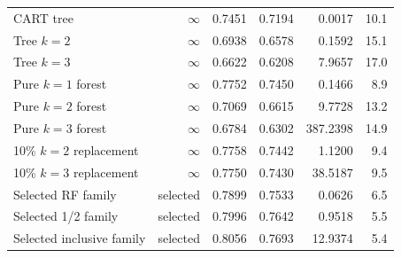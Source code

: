 \documentclass[final,5p,times]{elsarticle}
\begin{document}
\begin{table}[t]
\begin{tabular}{@{}lrrrrr@{}}
\addlinespace
CART tree & $\infty$ & 0.7451 & 0.7194 & 0.0017 & 10.1 \\
Tree $k=2$ & $\infty$ & 0.6938 & 0.6578 & 0.1592 & 15.1 \\
Tree $k=3$ & $\infty$ & 0.6622 & 0.6208 & 7.9657 & 17.0 \\
Pure $k=1$ forest & $\infty$ & 0.7752 & 0.7450 & 0.1466 & 8.9 \\
Pure $k=2$ forest & $\infty$ & 0.7069 & 0.6615 & 9.7728 & 13.2 \\
Pure $k=3$ forest & $\infty$ & 0.6784 & 0.6302 & 387.2398 & 14.9 \\
10\% $k=2$ replacement & $\infty$ & 0.7758 & 0.7442 & 1.1200 & 9.4 \\
10\% $k=3$ replacement & $\infty$ & 0.7750 & 0.7430 & 38.5187 & 9.5 \\
\midrule
Selected RF family & selected & 0.7899 & 0.7533 & 0.0626 & 6.5 \\
Selected 1/2 family & selected & 0.7996 & 0.7642 & 0.9518 & 5.5 \\
Selected inclusive family & selected & 0.8056 & 0.7693 & 12.9374 & 5.4 \\
\bottomrule
\end{tabular}
\end{table}
\end{document}
